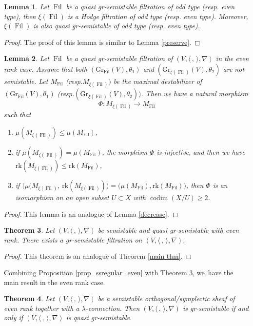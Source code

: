 \documentclass[11pt]{article}
\newcommand{\resp}{resp.\xspace}
\numberwithin{equation}{section}
\newcommand{\lconnection}{$\lambda$\nobreakdash-con\-nec\-tion\xspace}
\newcommand{\grsemistable}{gr\nobreakdash-semi\-stable\xspace}
\DeclareMathOperator{\codim}{codim}
\DeclareMathOperator{\Filt}{Fil}
\newcommand{\rk}{\mathrm{rk}}
\newcommand{\Gr}{\mathrm{Gr}}
\theoremstyle{plain}
\newtheorem{thm}{Theorem}[section]
\newtheorem{lem}[thm]{Lemma}
\theoremstyle{definition}
\begin{document}
\begin{lem}
Let $\Filt$ be a quasi \grsemistable filtration of odd type (\resp even type), then $\xi(\Filt)$ is a Hodge filtration of odd type (\resp even type). Moreover, $\xi(\Filt)$ is also quasi \grsemistable of odd type (\resp even type).
\end{lem}

\begin{proof}
The proof of this lemma is similar to Lemma \ref{preserve}.
\end{proof}

\begin{lem}
Let $\Filt$ be a quasi \grsemistable filtration of $(V,\langle \,, \, \rangle,\nabla)$ in the even rank case. Assume that both $(\Gr_{\Filt}(V),\theta_1)$ and $(\Gr_{\xi(\Filt)}(V),\theta_2)$ are not semistable. Let $M_{\Filt}$ (\resp $M_{\xi(\Filt)})$ be the maximal destabilizer of $(\Gr_{\Filt}(V),\theta_1)$ (\resp $(\Gr_{\xi(\Filt)}(V),\theta_2))$. Then we have a natural morphism
\[
\Phi: M_{\xi(\Filt)}\to M_{\Filt}
\]
such that
\begin{enumerate}
\item $\mu(M_{\xi(\Filt)})\leq \mu(M_{\Filt})$,

\item if $\mu(M_{\xi(\Filt)})= \mu(M_{\Filt})$, the morphism $\Phi$ is injective, and then we have $\rk(M_{\xi(\Filt)})\leq\rk(M_{\Filt})$,

\item if $\big(\mu(M_{\xi(\Filt)},\ \rk(M_{\xi(\Filt)})\big)= \big(\mu(M_{\Filt}),\rk(M_{\Filt})\big)$, then $\Phi$ is an isomorphism on an open subset $U \subset X$ with $\codim(X/U) \geq 2$.
\end{enumerate}
\end{lem}

\begin{proof}
This lemma is an analogue of Lemma \ref{decrease}.
\end{proof}

\begin{thm}\label{main thm even}
Let $(V,\langle \,, \, \rangle,\nabla)$ be semistable and quasi \grsemistable with even rank. There exists a \grsemistable filtration on $(V,\langle \,, \, \rangle,\nabla)$.
\end{thm}

\begin{proof}
This theorem is an analogue of Theorem \ref{main thm}.
\end{proof}

Combining Proposition \ref{prop_ssregular_even} with Theorem \ref{main thm even}, we~have the main result in the even rank case.
\begin{thm}\label{thm_even}
Let $(V,\langle \,, \, \rangle,\nabla)$ be a semistable orthogonal/symplectic sheaf of even rank together with a \lconnection. Then $(V,\langle \,, \, \rangle,\nabla)$ is \grsemistable if and only if $(V,\langle \,, \, \rangle,\nabla)$ is quasi \grsemistable.
\end{thm}
\end{document}
